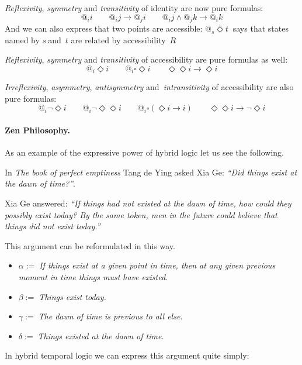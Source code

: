 \emph{Reflexivity}, \emph{symmetry} and \emph{transitivity} of identity are
now  pure formulas:%
$$
@_{i}i\qquad @_{i}j\rightarrow @_{j}i\qquad @_{i}j\wedge @_{j}k\rightarrow
@_{i}k
$$
And we can also express that two points are accessible: $@_{s}\Diamond t\ $%
says that states named by $s\ $and\ $t$ are related by accessibility\ $R$

\emph{Reflexivity}, \emph{symmetry} and \emph{transitivity} of accessibility
are pure formulas as well:%
$$
@_{i}\Diamond i\qquad @_{i}\square \Diamond i\qquad \Diamond \Diamond
i\rightarrow \Diamond i
$$

\emph{Irreflexivity}, \emph{asymmetry}, \emph{antisymmetry} and\emph{\
intransitivity} of accessibility are also pure formulas: 
$$
@_{i}\lnot \Diamond i\qquad @_{i}\lnot \Diamond \Diamond i\qquad
@_{i}\square (\Diamond i\rightarrow i)\qquad \Diamond \Diamond i\rightarrow
\lnot \Diamond i
$$


\paragraph{Zen Philosophy.}
As an example of the expressive power of hybrid logic let us see the
following.

In \emph{The book of perfect emptiness} Tang de Ying asked Xia Ge: 
\emph{``Did things exist at the dawn of time?''}.

Xia Ge answered: \emph{``If things had not existed at the
dawn of time, how could they possibly exist today? By the same token, men in
the future could believe that things did not exist today.''}

This argument can be reformulated in this way.

\begin{itemize}
\item $\alpha :=\;$\emph{If things exist at a given point in time, then at
any given previous moment in time things must have existed.}

\item $\beta :=\;$\emph{Things exist today.}

\item $\gamma :=\;$\emph{The dawn of time is previous to all else.}

\item $\delta :=\;$\emph{Things existed at the dawn of time.}
\end{itemize}

In hybrid temporal logic we can express this argument quite simply:

